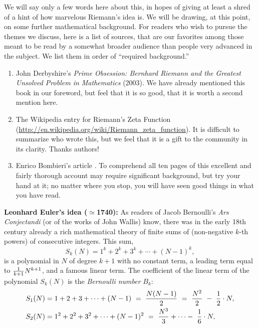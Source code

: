 \documentclass[openany]{book}
\theoremstyle{plain}
\theoremstyle{definition}
\begin{document}
{{ We will say only a few words here about this, in hopes of giving at
 least a shred of a hint of how marvelous Riemann's idea is.  We will be drawing, at this point, on some further mathematical background.  For
 readers who wish to pursue the themes we discuss, here is a list of sources,
 that are our favorites among those meant to be read by a somewhat
 broader audience than people very advanced in the subject. We list
 them in order of ``required background.''

 \begin{enumerate}
 \item John Derbyshire's {\it Prime Obsession: Bernhard Riemann and
     the Greatest Unsolved Problem in Mathematics} (2003).  We have already
   mentioned this book in our foreword, but feel that it is so
   good, that it is worth a second mention here.
 \item The Wikipedia entry for Riemann's Zeta Function
   (\url{http://en.wikipedia.org/wiki/Riemann\_zeta\_function}). It is
   difficult to summarize who wrote this, but we feel that it is a
   gift to the community in its clarity. Thanks authors!
 \item Enrico Bombieri's article .
   To comprehend all ten pages of this excellent and fairly thorough
   account may require significant background, but try your hand at
   it; no matter where you stop, you will have seen good things in
   what you have read.
\end{enumerate}
\vskip20pt
{\bf Leonhard Euler's idea ($\simeq$1740):}
As readers of Jacob Bernoulli's {\it Ars Conjectandi} (or of the works
of John Wallis) know, there was in the early 18th century
already a rich mathematical theory of
finite sums of (non-negative $k$-th powers) of consecutive integers.
This sum, $$S_k(N) = 1^k+2^k+3^k+\cdots +(N-1)^k,$$ is a polynomial
in $N$ of degree $k+1$ with no constant term, a leading term equal to
${1\over k+1}N^{k+1}$, and a famous linear term.  The coefficient of
the linear term of the polynomial $S_k(N)$ is the {\it Bernoulli
  number} $B_{k}$:
\begin{align*}
S_1(N) &= 1+2+3+ \dots + (N-1) \ = \ {N(N-1)\over 2}  \ = \  {N^2\over 2}\ -\  {1\over 2}\cdot N,\\
S_2(N) &= 1^2+2^2+3^2+ \dots + (N-1)^2 \ = \   {N^3\over 3} +\cdots -\ {1\over 6}\cdot N,\\

\end{align*}}}
\end{document}
